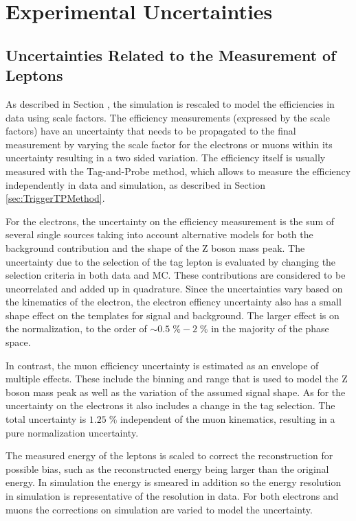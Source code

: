 \section{Experimental Uncertainties}
\label{sec:exp_uncert}

\subsection{Uncertainties Related to the Measurement of  Leptons}

As described in Section , the simulation is rescaled to model the efficiencies in data using scale factors. The efficiency measurements (expressed by the scale factors) have an uncertainty that needs to be propagated to the final measurement by varying the scale factor for the electrons or muons within its uncertainty resulting in a two sided variation.
The efficiency itself is usually measured with the Tag-and-Probe method, which allows to measure the efficiency independently in data and simulation, as described in Section \ref{sec:TriggerTPMethod}.

For the electrons, the uncertainty on the efficiency measurement is the sum of several single sources taking into account alternative models for both the background contribution
and the shape of the Z boson mass peak.
The uncertainty due to the selection of the tag lepton is evaluated by changing the selection criteria in both data and MC.
These contributions are considered to be uncorrelated and added up in quadrature. 
Since the uncertainties vary based on the kinematics of the electron, the electron effiency uncertainty also has a small shape effect on the templates for signal and background. The larger effect
is on the normalization, to the order of $\sim 0.5 \; \% - 2\; \%$ in the majority of the phase space.

In contrast, the muon efficiency uncertainty is estimated as an envelope of multiple effects. These include the binning and range that is used to model the Z boson mass peak as well as the variation of the assumed signal shape. As for the uncertainty on the electrons it also includes a change in the tag selection.
The total uncertainty is $1.25 \; \%$ independent of the muon kinematics, resulting in a pure normalization uncertainty.

The measured energy of the leptons is scaled to correct the reconstruction for possible bias, such as the reconstructed energy being larger than the original energy. In simulation the energy is smeared in addition so the energy resolution in simulation is representative of the resolution in data.
For both electrons and muons the corrections on simulation are varied to model the uncertainty.

